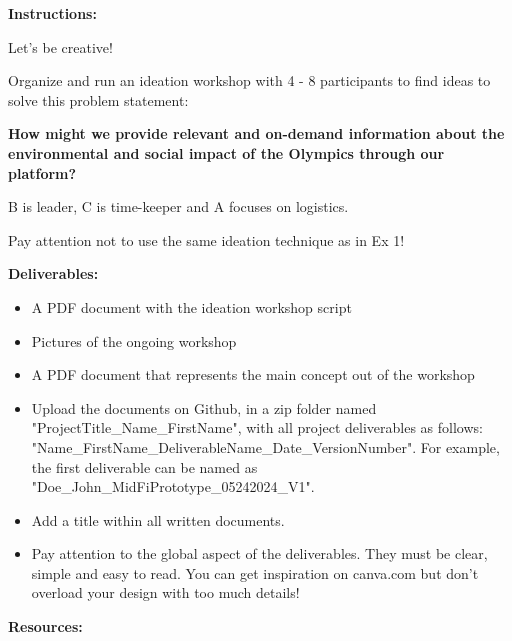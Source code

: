 \makeheaderfiles

\textbf{Instructions:}

Let's be creative!

Organize and run an ideation workshop with 4 - 8 participants to find ideas to solve this problem statement:

\textbf{How might we provide relevant and on-demand information about the environmental and social impact of the Olympics through our platform?}

B is leader, C is time-keeper and A focuses on logistics.

Pay attention not to use the same ideation technique as in Ex 1!

\textbf{Deliverables:}

\begin{itemize}
\item A PDF document with the ideation workshop script
\item Pictures of the ongoing workshop
\item A PDF document that represents the main concept out of the workshop
\item Upload the documents on Github, in a zip folder named "ProjectTitle\_Name\_FirstName", with all project deliverables as follows: "Name\_FirstName\_DeliverableName\_Date\_VersionNumber".  For example, the first deliverable can be named as "Doe\_John\_MidFiPrototype\_05242024\_V1".
\item Add a title within all written documents.
\item Pay attention to the global aspect of the deliverables. They must be clear, simple and easy to read. You can get inspiration on canva.com but don't overload your design with too much details!
\end{itemize}

\textbf{Resources:}

